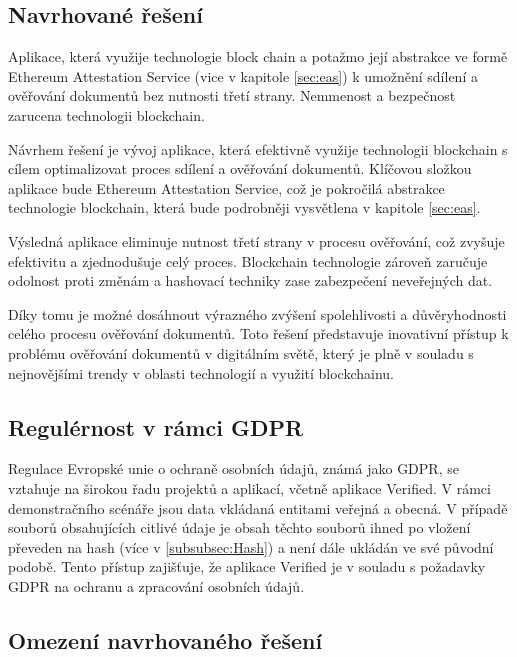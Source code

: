 \subsection{Navrhované řešení}

Aplikace, která využije technologie block chain a potažmo její abstrakce ve formě Ethereum Attestation Service (vice v kapitole \ref{sec:eas}) k umožnění sdílení a ověřování dokumentů bez nutnosti třetí strany. Nemmenost a bezpečnost zarucena technologii blockchain. 


Návrhem řešení je vývoj aplikace, která efektivně využije technologii blockchain s cílem optimalizovat proces sdílení a ověřování dokumentů. Klíčovou složkou aplikace bude Ethereum Attestation Service, což je pokročilá abstrakce technologie blockchain, která bude podrobněji vysvětlena v kapitole \ref{sec:eas}.

Výsledná aplikace eliminuje nutnost třetí strany v procesu ověřování, což zvyšuje efektivitu a zjednodušuje celý proces. Blockchain technologie zároveň zaručuje odolnost proti změnám a hashovací techniky zase zabezpečení neveřejných dat.

Díky tomu je možné dosáhnout výrazného zvýšení spolehlivosti a důvěryhodnosti celého procesu ověřování dokumentů. Toto řešení představuje inovativní přístup k problému ověřování dokumentů v digitálním světě, který je plně v souladu s nejnovějšími trendy v oblasti technologií a využití blockchainu.




\subsection{Regulérnost v rámci GDPR}\label{subsec:GDPR}


Regulace Evropské unie o ochraně osobních údajů, známá jako GDPR, se vztahuje na širokou řadu projektů a aplikací, včetně aplikace Verified. V rámci demonstračního scénáře jsou data vkládaná entitami veřejná a obecná. V případě souborů obsahujících citlivé údaje je obsah těchto souborů ihned po vložení převeden na hash (více v \ref{subsubsec:Hash}) a není dále ukládán ve své původní podobě. Tento přístup zajišťuje, že aplikace Verified je v souladu s požadavky GDPR na ochranu a zpracování osobních údajů.



\subsection{Omezení navrhovaného řešení}\label{subsec:Restrictions}

